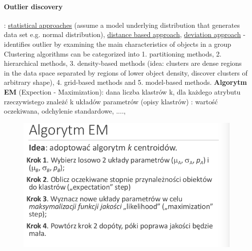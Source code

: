 \documentclass[10pt,a4paper]{article}
\begin{document}
  \paragraph{Outlier discovery} : \underline{statistical approaches} (assume a model underlying distribution that generates data set e.g. normal distribution), \underline{distance based approach}, \underline{deviation approach} - identifies outlier by examining the main characteristics of objects in a group \\
  Clustering algorithms can be categorized into 1. partitioning methods, 2. hierarchical methods, 3. density-based methods (idea: clusters are dense regions in the data space separated by regions of lower object density, discover clusters of arbitrary shape), 4. grid-based methods and 5. model-based methods.
  \textbf{Algorytm EM} (Expection - Maximization): dana liczba klastrów k, dla każdego atrybutu rzeczywistego znależć k układów parametrów (opisy klastrów) : wartość oczekiwana, odchylenie standardowe, ....,
  \begin{figure}[H]
    \centering
      \includegraphics[scale=0.50]{images/algEM.png}
  \end{figure}
\end{document}
